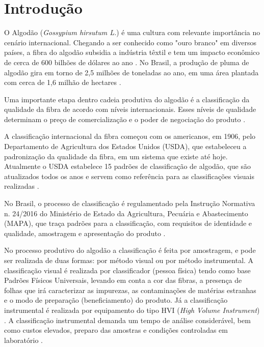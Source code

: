 
\chapter[Introdução]{Introdução}
\label{Introdução}


O Algodão (\textit{Gossypium hirsutum L.}) é uma cultura com relevante importância no cenário internacional. 
Chegando a ser conhecido como "ouro branco" em diversos países, a fibra do algodão subsidia a indústria têxtil e tem um impacto
econômico de cerca de 600 bilhões de dólares ao ano \cite{Khan2020}. No Brasil, a produção de pluma de
algodão gira em torno de 2,5 milhões de toneladas ao ano, em uma área plantada com cerca de 1,6 milhão
de hectares \cite{conab2024}.

Uma importante etapa dentro cadeia produtiva do algodão é a classificação da qualidade da fibra de
acordo com níveis internacionais. Esses níveis de qualidade determinam o preço de comercialização e o
poder de negociação do produto \cite{yasar2021quality}.

A classificação internacional da fibra começou com os americanos, em 1906, pelo Departamento de
Agricultura dos Estados Unidos (USDA), que estabeleceu a padronização da qualidade da fibra, em um
sistema que existe até hoje. Atualmente o USDA estabelece 15 padrões de classificação de algodão, que
são atualizados todos os anos e servem como referência para as classificações visuais realizadas \cite{cottoninc2017}.

No Brasil, o processo de classificação é regulamentado pela Instrução Normativa n. 24/2016 do
Ministério de Estado da Agricultura, Pecuária e Abastecimento (MAPA), que traça padrões para a
classificação, com requisitos de identidade e qualidade, amostragem e apresentação do produto \cite{mapa2016}.

No processo produtivo do algodão a classificação é feita por amostragem, e pode ser realizada de duas
formas: por método visual ou por método instrumental. A classificação visual é realizada por classificador
(pessoa física) tendo como base Padrões Físicos Universais, levando em conta a cor das fibras, a presença
de folhas que irá caracterizar as impurezas, as contaminações de matérias estranhas e o modo de
preparação (beneficiamento) do produto. Já a classificação instrumental é realizada por equipamento do
tipo HVI (\textit{High Volume Instrument}) \cite{mapa2016}. A classificação instrumental demanda um tempo de análise 
considerável, bem como custos elevados, preparo das amostras e condições controladas em laboratório \cite{Oliveira2022}.

